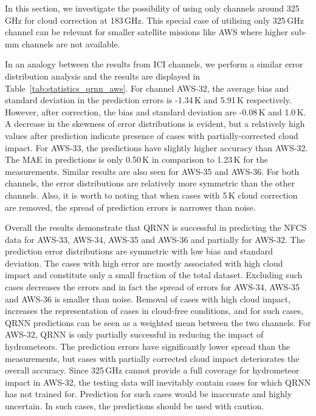 \documentclass[amt, manuscript]{copernicus}
\begin{document}

In this section, we investigate the possibility of using only channels around 325\,GHz for cloud correction at 183\,GHz. This special case of utilising only 325\,GHz channel can be relevant for smaller satellite missions like AWS where higher sub-mm channels are not available. 

In an analogy between the results from ICI channels, we perform a similar error distribution analysis 
and the results are displayed in Table~\ref{tab:statistics_qrnn_aws}. For channel AWS-32, the average bias and standard deviation in the prediction errors is -1.34\,K and 5.91\,K respectively. However, after correction, the bias and standard deviation are -0.08\,K and 1.0\,K. A decrease in the skewness of error distributions is evident, but a relatively high values after prediction indicate presence of cases with partially-corrected cloud impact. For AWS-33, the predictions have slightly higher accuracy than AWS-32. The MAE in predictions is only 0.50\,K in comparison to 1.23\,K for the measurements. Similar results are also seen for AWS-35 and AWS-36. For both channels, the error distributions are relatively more symmetric than the other channels. Also, it is worth to noting that when cases with 5\,K cloud correction are removed, the spread of prediction errors is narrower than noise. 

Overall the results demonstrate that QRNN is successful in predicting the NFCS data for AWS-33, AWS-34, AWS-35 and AWS-36 and partially for AWS-32. The prediction error distributions are symmetric with low bias and standard deviation. The cases with high error are mostly associated with high cloud impact and constitute only a small fraction of the total dataset. Excluding such cases decreases the errors and in fact the spread of errors for AWS-34, AWS-35 and AWS-36 is smaller than noise. Removal of cases with high cloud impact, increases the representation of cases in cloud-free conditions, and for such cases, QRNN predictions can be seen as a weighted mean between the two channels. For AWS-32, QRNN is only partially successful in reducing the impact of hydrometeors. The prediction errors have significantly lower spread than the measurements, but cases with partially corrected cloud impact deteriorates the overall accuracy. Since 325\,GHz cannot provide a full coverage for hydrometeor impact in AWS-32, the testing data will inevitably contain cases for which QRNN has not trained for. Prediction for such cases would be inaccurate and highly uncertain. In such cases, the predictions should be used with caution. 
\end{document}
